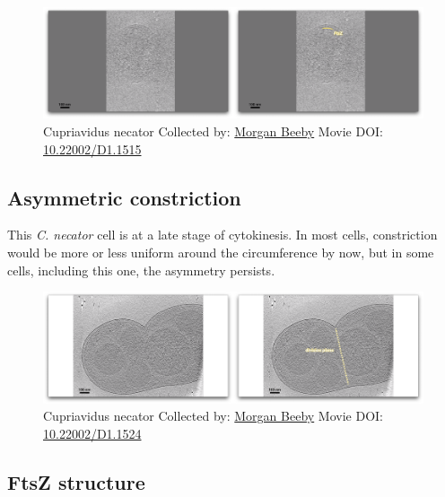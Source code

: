 \documentclass[]{tufte-book}
\begin{document}
\begin{figure}
\includegraphics{movie_stills/5_9} \caption[Cupriavidus necator Collected by:
\protect\hyperlink{morgan_beeby}{Morgan Beeby} Movie DOI:
\href{https://doi.org/10.22002/D1.1515}{10.22002/D1.1515}]{Cupriavidus necator Collected by:
\protect\hyperlink{morgan_beeby}{Morgan Beeby} Movie DOI:
\href{https://doi.org/10.22002/D1.1515}{10.22002/D1.1515}}\label{fig:5-9}
\end{figure}

\hypertarget{Asymmetric_constriction}{\subsection{Asymmetric
constriction}\label{Asymmetric_constriction}}

This \emph{C. necator} cell is at a late stage of cytokinesis. In most
cells, constriction would be more or less uniform around the
circumference by now, but in some cells, including this one, the
asymmetry persists.





\begin{figure}
\includegraphics{movie_stills/5_9a} \caption[Cupriavidus necator Collected by:
\protect\hyperlink{morgan_beeby}{Morgan Beeby} Movie DOI:
\href{https://doi.org/10.22002/D1.1524}{10.22002/D1.1524}]{Cupriavidus necator Collected by:
\protect\hyperlink{morgan_beeby}{Morgan Beeby} Movie DOI:
\href{https://doi.org/10.22002/D1.1524}{10.22002/D1.1524}}\label{fig:5-9a}
\end{figure}

\subsection{FtsZ structure}\label{FtsZ_structure}
\end{document}

